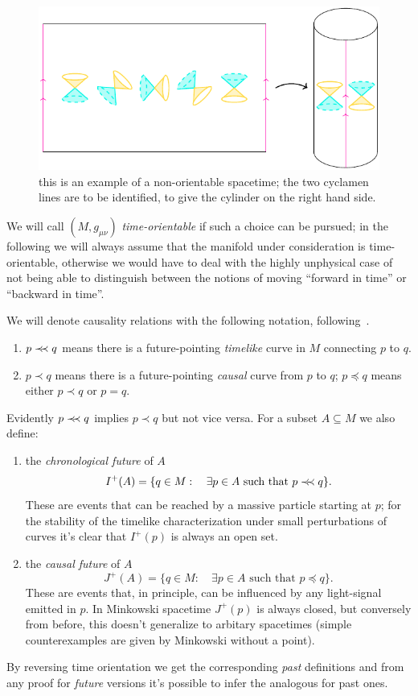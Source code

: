 \begin{figure}
	\caption[]{this is an example of a non-orientable spacetime; the two cyclamen lines are to be identified, to give the cylinder on the right hand side.}
	\label{fig:time-orientable}
	\centering
	\includegraphics[scale=1.2]{Immagini/time-orientable/time-orientable.pdf}
\end{figure}


We will call \((M, g_{\mu\nu})\) \emph{time-orientable} if such a  choice can be pursued; in the following we will always assume that the manifold under consideration is time-orientable, otherwise we would have to deal with the highly unphysical case of not being able to distinguish between the notions of moving ``forward in time'' or ``backward in time''.

We will denote causality relations with the following notation, following~\cite{o1983semi}.
\begin{enumerate}
	\item  \(p \prec\mathrel{\mkern-5mu}\prec q\) means there is a future-pointing \emph{timelike} curve in \(M\) connecting \(p\) to \(q\).
	\item \(p \prec q\) means there is a future-pointing \emph{causal} curve from \(p\) to \(q\); \(p \preceq q\) means either \(p \prec q\) or \(p = q\).
\end{enumerate}

Evidently \(p\prec\mathrel{\mkern-5mu}\prec q\) implies \(p\prec q\) but not vice versa. For a subset \(A \subseteq M\) we also define:
\begin{enumerate}
	\item the \emph{chronological future} of \(A\)
	\[
	I^+(A) =\{ q\in M :\quad\exists p \in A\text{ such that } p\prec\mathrel{\mkern-5mu}\prec q\}.
	\]
	These are events that can be reached by a massive particle starting at \(p\); for the stability of the timelike characterization under small perturbations of curves it's clear that \(I^+(p)\) is always an open set.
	\item the \emph{causal future} of \(A\)
	\[
	J^+(A) =\{ q\in M : \quad\exists p \in A\text{ such that } p\preceq q\}.
	\]
	These are events that, in principle, can be influenced by any light-signal emitted in \(p\). In Minkowski spacetime \(J^+(p)\) is always closed, but conversely from before, this doesn't generalize to arbitary spacetimes (simple counterexamples are given by Minkowski without a point).
\end{enumerate}
By reversing time orientation we get the corresponding \emph{past} definitions and from any proof for \emph{future} versions it's possible to infer the analogous for past ones.

